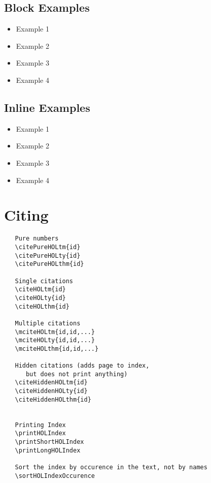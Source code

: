 \documentclass{article}
\begin{document}
\subsection{Block Examples}
\begin{itemize}
\item Example 1 
\item Example 2 
\item Example 3 
\item Example 4 
\end{itemize}


\subsection{Inline Examples}
\begin{itemize}
\item Example 1 
\item Example 2 
\item Example 3 
\item Example 4 
\end{itemize}



\section{Citing}

\begin{verbatim}
   Pure numbers
   \citePureHOLtm{id}
   \citePureHOLty{id}
   \citePureHOLthm{id}

   Single citations
   \citeHOLtm{id}
   \citeHOLty{id}
   \citeHOLthm{id}

   Multiple citations 
   \mciteHOLtm{id,id,...}
   \mciteHOLty{id,id,...}
   \mciteHOLthm{id,id,...}

   Hidden citations (adds page to index, 
      but does not print anything)
   \citeHiddenHOLtm{id}
   \citeHiddenHOLty{id}
   \citeHiddenHOLthm{id}


   Printing Index 
   \printHOLIndex
   \printShortHOLIndex 
   \printLongHOLIndex 

   Sort the index by occurence in the text, not by names
   \sortHOLIndexOccurence
\end{verbatim}
\end{document}
